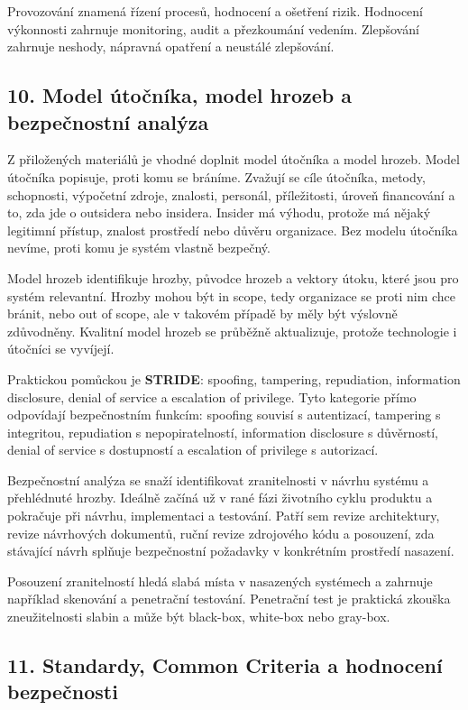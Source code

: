\documentclass[11pt,a4paper]{article}
\begin{document}
Provozování znamená řízení procesů, hodnocení a ošetření rizik. Hodnocení výkonnosti zahrnuje monitoring, audit a přezkoumání vedením. Zlepšování zahrnuje neshody, nápravná opatření a neustálé zlepšování.

\subsection*{10. Model útočníka, model hrozeb a bezpečnostní analýza}

Z přiložených materiálů je vhodné doplnit model útočníka a model hrozeb. Model útočníka popisuje, proti komu se bráníme. Zvažují se cíle útočníka, metody, schopnosti, výpočetní zdroje, znalosti, personál, příležitosti, úroveň financování a to, zda jde o outsidera nebo insidera. Insider má výhodu, protože má nějaký legitimní přístup, znalost prostředí nebo důvěru organizace. Bez modelu útočníka nevíme, proti komu je systém vlastně bezpečný.

Model hrozeb identifikuje hrozby, původce hrozeb a vektory útoku, které jsou pro systém relevantní. Hrozby mohou být in scope, tedy organizace se proti nim chce bránit, nebo out of scope, ale v takovém případě by měly být výslovně zdůvodněny. Kvalitní model hrozeb se průběžně aktualizuje, protože technologie i útočníci se vyvíjejí.

Praktickou pomůckou je \textbf{STRIDE}: spoofing, tampering, repudiation, information disclosure, denial of service a escalation of privilege. Tyto kategorie přímo odpovídají bezpečnostním funkcím: spoofing souvisí s autentizací, tampering s integritou, repudiation s nepopiratelností, information disclosure s důvěrností, denial of service s dostupností a escalation of privilege s autorizací.

Bezpečnostní analýza se snaží identifikovat zranitelnosti v návrhu systému a přehlédnuté hrozby. Ideálně začíná už v rané fázi životního cyklu produktu a pokračuje při návrhu, implementaci a testování. Patří sem revize architektury, revize návrhových dokumentů, ruční revize zdrojového kódu a posouzení, zda stávající návrh splňuje bezpečnostní požadavky v konkrétním prostředí nasazení.

Posouzení zranitelností hledá slabá místa v nasazených systémech a zahrnuje například skenování a penetrační testování. Penetrační test je praktická zkouška zneužitelnosti slabin a může být black-box, white-box nebo gray-box.

\subsection*{11. Standardy, Common Criteria a hodnocení bezpečnosti}
\end{document}
